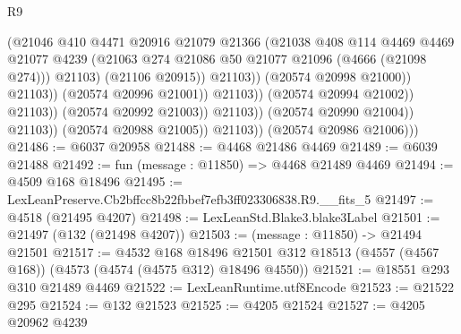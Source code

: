 \begin{lexlean}{R9}
\begin{coremodule}
                                                (@21046
                                                  @410
                                                  @4471
                                                  @20916
                                                  @21079
                                                  @21366
                                                  (@21038
                                                    @408
                                                    @114
                                                    @4469
                                                    @4469
                                                    @21077
                                                    @4239
                                                    (@21063
                                                      @274
                                                      @21086
                                                      @50
                                                      @21077
                                                      @21096
                                                      (@4666 (@21098 @274)))
                                                    @21103)
                                                  (@21106 @20915))
                                                @21103))
                                            (@20574 @20998 @21000))
                                          @21103))
                                      (@20574 @20996 @21001))
                                    @21103))
                                (@20574 @20994 @21002))
                              @21103))
                          (@20574 @20992 @21003))
                        @21103))
                    (@20574 @20990 @21004))
                  @21103))
              (@20574 @20988 @21005))
            @21103))
        (@20574 @20986 @21006)))
@21486 := @6037 @20958
@21488 := @4468 @21486 @4469
@21489 := @6039 @21488
@21492 := fun (message : @11850) => @4468 @21489 @4469
@21494 := @4509 @168 @18496
@21495 := LexLeanPreserve.Cb2bffcc8b22fbbef7efb3ff023306838.R9.__fits_5
@21497 := @4518 (@21495 @4207)
@21498 := LexLeanStd.Blake3.blake3Label
@21501 := @21497 (@132 (@21498 @4207))
@21503 := (message : @11850) -> @21494 @21501
@21517 := @4532
    @168
    @18496
    @21501
    @312
    @18513
    (@4557 (@4567 @168))
    (@4573 (@4574 (@4575 @312) @18496 @4550))
@21521 := @18551 @293 @310 @21489 @4469
@21522 := LexLeanRuntime.utf8Encode
@21523 := @21522 @295
@21524 := @132 @21523
@21525 := @4205 @21524
@21527 := @4205 @20962 @4239

\end{coremodule}
\end{lexlean}
